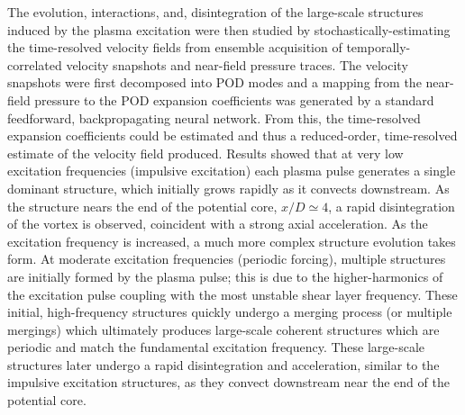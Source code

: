 The evolution, interactions, and, disintegration of the large-scale structures induced by the plasma excitation were then studied by stochastically-estimating the time-resolved velocity fields from ensemble acquisition of temporally-correlated velocity snapshots and near-field pressure traces.
The velocity snapshots were first decomposed into POD modes and a mapping from the near-field pressure to the POD expansion coefficients was generated by a standard feedforward, backpropagating neural network.
From this, the time-resolved expansion coefficients could be estimated and thus a reduced-order, time-resolved estimate of the velocity field produced.
Results showed that at very low excitation frequencies (impulsive excitation) each plasma pulse generates a single dominant structure, which initially grows rapidly as it convects downstream. 
As the structure nears the end of the potential core, $x/D \simeq 4$, a rapid disintegration of the vortex is observed, coincident with a strong axial acceleration.
As the excitation frequency is increased, a much more complex structure evolution takes form.
At moderate excitation frequencies (periodic forcing), multiple structures are initially formed by the plasma pulse; this is due to the higher-harmonics of the excitation pulse coupling with the most unstable shear layer frequency.
These initial, high-frequency structures quickly undergo a merging process (or multiple mergings) which ultimately produces large-scale coherent structures which are periodic and match the fundamental excitation frequency.
These large-scale structures later undergo a rapid disintegration and acceleration, similar to the impulsive excitation structures, as they convect downstream near the end of the potential core. 

